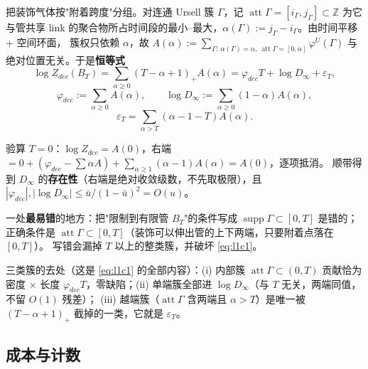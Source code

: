 把装饰气体按"附着跨度"分组。对连通 Ursell 簇 $\Gamma$，记 $\operatorname{att}\Gamma=[i_\Gamma,j_\Gamma]\subset\mathbb{Z}$
为它与管共享 link 的聚合物所占时间段的最小--最大，$\alpha(\Gamma):=j_\Gamma-i_\Gamma$。由时间平移 + 空间环面，
簇权只依赖 $\alpha$，故 $A(\alpha):=\sum_{\Gamma:\,\alpha(\Gamma)=\alpha,\ \operatorname{att}\Gamma=[0,\alpha]}\varphi^U(\Gamma)$
与绝对位置无关。于是\textbf{恒等式}\LT
\begin{equation}
\log Z_{dec}(B_T)=\sum_{\alpha\ge0}(T-\alpha+1)_+A(\alpha)
=\varphi_{dec}T+\log D_\infty+\varepsilon_T,
\label{eq:l1c1}
\end{equation}
\[
\varphi_{dec}:=\sum_{\alpha\ge0}A(\alpha),\qquad
\log D_\infty:=\sum_{\alpha\ge0}(1-\alpha)A(\alpha),
\]
\[
\varepsilon_T=\sum_{\alpha>T}(\alpha-1-T)A(\alpha).
\]

验算 $T=0$：$\log Z_{dec}=A(0)$，右端 $=0+(\varphi_{dec}-\sum\alpha A)+\sum_{\alpha\ge1}(\alpha-1)A(\alpha)=A(0)$，逐项抵消。\LT
顺带得到 $D_\infty$ 的\textbf{存在性}（右端是绝对收敛级数，不先取极限），且 $|\varphi_{dec}|,|\log D_\infty|\le\bar u/(1-\bar u)^2=O(u)$。

一处\textbf{最易错}的地方：把"限制到有限管 $B_T$"的条件写成 $\operatorname{supp}\Gamma\subset[0,T]$ 是错的；
正确条件是 $\operatorname{att}\Gamma\subset[0,T]$（装饰可以伸出管的上下两端，只要附着点落在 $[0,T]$）。
写错会漏掉 $T$ 以上的整类簇，并破坏 \eqref{eq:l1c1}。\LT
{}

三类簇的去处（这是 \eqref{eq:l1c1} 的全部内容）：(i) 内部簇 $\operatorname{att}\Gamma\subset(0,T)$ 贡献恰为密度 $\times$ 长度
$\varphi_{dec}T$，零缺陷；(ii) 单端簇全部进 $\log D_\infty$（与 $T$ 无关，两端同值，不留 $O(1)$ 残差）；
(iii) 越端簇（$\operatorname{att}\Gamma$ 含两端且 $\alpha>T$）是唯一被 $(T-\alpha+1)_+$ 截掉的一类，它就是 $\varepsilon_T$。\LT
{}

\subsection{成本与计数}

